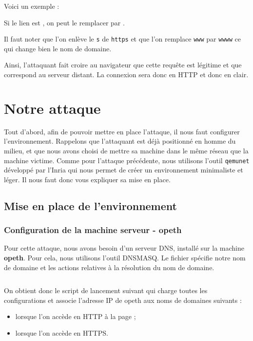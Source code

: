 Voici un exemple :

Si le lien est , on peut le remplacer par .

Il faut noter que l'on enlève le \verb+s+ de \verb+https+ et que l'on remplace \verb+www+ par \verb+wwww+ ce qui change bien le nom de domaine.

Ainsi, l'attaquant fait croire au navigateur que cette requête est légitime et que  correspond au serveur distant. La connexion sera donc en HTTP et donc en clair.

\section{Notre attaque}

Tout d'abord, afin de pouvoir mettre en place l'attaque, il nous faut configurer l'environnement. Rappelons que l'attaquant est déjà positionné en homme du milieu, et que nous avons choisi de mettre sa machine dans le même réseau que la machine victime. Comme pour l'attaque précédente, nous utilisons l'outil \verb+qemunet+ développé par l'Inria qui nous permet de créer un environnement minimaliste et léger. Il nous faut donc vous expliquer sa mise en place.

\subsection{Mise en place de l'environnement}

\subsubsection{Configuration de la machine serveur - opeth}

Pour cette attaque, nous avons besoin d'un serveur DNS, installé sur la machine \textbf{opeth}. Pour cela, nous utilisons l'outil DNSMASQ. Le fichier  spécifie notre nom de domaine et les actions relatives à la résolution du nom de domaine.

\inputminted[bgcolor=lbcolor, breaklines]{shell}{../sslstrip2/opeth/dnsmasq.conf}

On obtient donc le script de lancement suivant qui charge toutes les configurations et associe l'adresse IP de opeth aux noms de domaines suivants :

\begin{itemize}
\item {} lorsque l'on accède en HTTP à la page ;
\item {} lorsque l'on accède en HTTPS.
\end{itemize}

